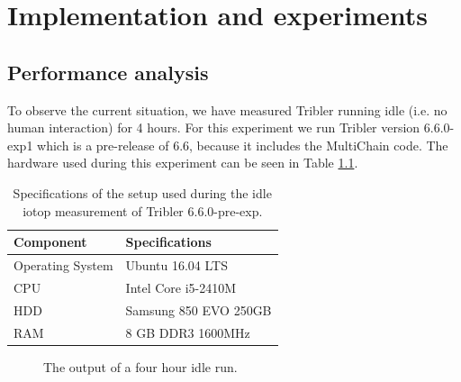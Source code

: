 \chapter{Implementation and experiments}
\label{implementation_and_experiments}

\section{Performance analysis}
To observe the current situation, we have measured Tribler running idle (i.e. no human interaction) for 4 hours.
For this experiment we run Tribler version 6.6.0-exp1 which is a pre-release of 6.6, because it includes the MultiChain code.
The hardware used during this experiment can be seen in Table \ref{table:tribler_idle}.

\begin{table}[h]
	\centering
	\begin{tabular}{l|l}
		\textbf{Component} 	& \textbf{Specifications} \\ \hline
		Operating System   	& Ubuntu 16.04 LTS \\
		CPU					& Intel Core i5-2410M \\ 
		HDD					& Samsung 850 EVO 250GB  \\ 
		RAM					& 8 GB DDR3 1600MHz \\
	\end{tabular}
	\caption{Specifications of the setup used during the idle iotop measurement of Tribler 6.6.0-pre-exp.}
	\label{table:tribler_idle}
\end{table}

\begin{figure}[h]
	\caption{The output of a four hour idle run.}
	\label{fig:htop_io_idle_run}
\end{figure} 

